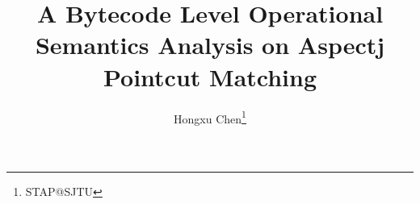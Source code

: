 \documentclass{article}
\begin{document}
\newcommand{\todo}[1]{{\textbf{(TODO: #1)}}}
\newcommand{\code}[1]{{\tt#1}}
\long{}


\long{}


\title{A Bytecode Level Operational Semantics Analysis on Aspectj Pointcut Matching}
\author{Hongxu Chen\footnote{STAP@SJTU}}
\date{}


\maketitle



\onecolumn

%




%






\end{document}
